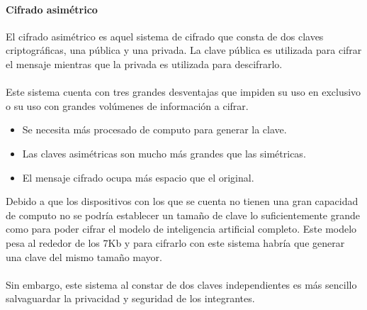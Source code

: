 \paragraph{Cifrado asimétrico}
El cifrado asimétrico es aquel sistema de cifrado que consta de dos claves criptográficas, una pública y una privada. La clave pública es utilizada para cifrar el mensaje mientras que la privada es utilizada para descifrarlo. 
\\ \\
Este sistema cuenta con tres grandes desventajas que impiden su uso en exclusivo o su uso con grandes volúmenes de información a cifrar. 
\begin{itemize}
    \item Se necesita más procesado de computo para generar la clave.
    \item Las claves asimétricas son mucho más grandes que las simétricas.
    \item El mensaje cifrado ocupa más espacio que el original.
\end{itemize}

Debido a que los dispositivos con los que se cuenta no tienen una gran capacidad de computo no se podría establecer un tamaño de clave lo suficientemente grande como para poder cifrar el modelo de inteligencia artificial completo. Este modelo pesa al rededor de los 7Kb y para cifrarlo con este sistema habría que generar una clave del mismo tamaño mayor.
\\ \\
Sin embargo, este sistema al constar de dos claves independientes es más sencillo salvaguardar la privacidad y seguridad de los integrantes.

